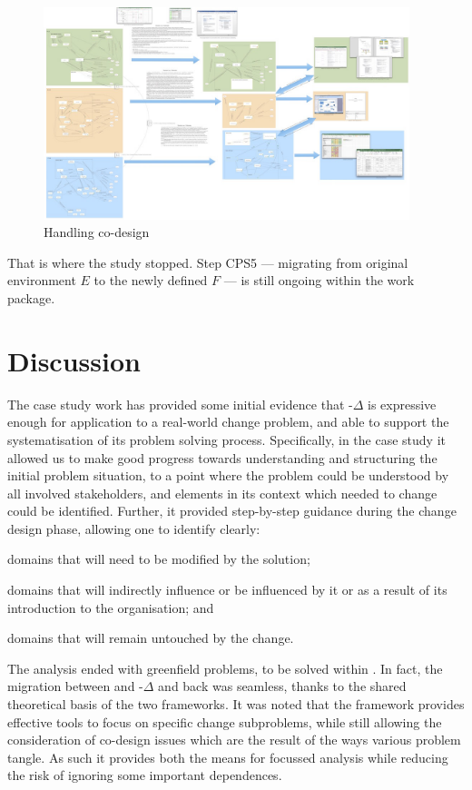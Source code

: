 \documentclass[runningheads,a4paper]{llncs}
\begin{document}
\begin{figure}[htbp]
	\centering
	\includegraphics[width=0.95\textwidth]{pics/pprogression.jpg}
	\caption{Handling co-design}
	\label{fig:pprog}
\end{figure}

That is where the study stopped. Step CPS5 --- migrating from original environment $E$ to the newly defined $F$ --- is still ongoing within the work package.

\section{Discussion}\label{sect:Discussion}

The case study work has provided some initial evidence that \POE{}-$\Delta$ is expressive enough for application to a real-world change problem, and able to support the systematisation of its problem solving process. Specifically, in the case study it allowed us to make good progress towards understanding and structuring the initial problem situation, to a point where the problem could be understood by all involved stakeholders, and elements in its context which needed to change could be identified. Further, it provided step-by-step guidance during the change design phase, allowing one to identify clearly: 
%
\begin{enumerate*}[label=(\roman*)]
\item domains that will need to be modified by the solution; 
\item domains that will indirectly influence or be influenced by it or as a result of its introduction to the organisation; and 
\item domains that will remain untouched by the change. 	
\end{enumerate*}

The analysis ended with greenfield problems, to be solved within \POE{}. In fact, the migration between \POE{} and \POE{}-$\Delta$ and back was seamless, thanks to the shared theoretical basis of the two frameworks. It was noted that the framework provides effective tools to focus on specific change subproblems, while still allowing the consideration of co-design issues which are the result of the ways various problem tangle. As such it provides both the means for focussed analysis while reducing the risk of ignoring some important dependences. 
\end{document}
